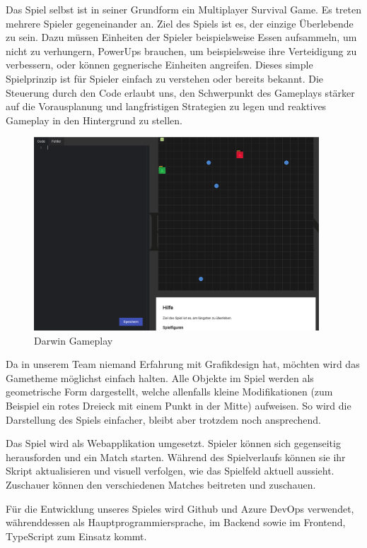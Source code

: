 \documentclass[11pt,a4paper]{scrartcl}
\begin{document}
Das Spiel selbst ist in seiner Grundform ein Multiplayer Survival Game.
Es treten mehrere Spieler gegeneinander an.
Ziel des Spiels ist es, der einzige Überlebende zu sein.
Dazu müssen Einheiten der Spieler beispielsweise Essen aufsammeln, um nicht zu verhungern, PowerUps brauchen, um beispielsweise ihre Verteidigung zu verbessern, oder können gegnerische Einheiten angreifen.
Dieses simple Spielprinzip ist für Spieler einfach zu verstehen oder bereits bekannt.
Die Steuerung durch den Code erlaubt uns, den Schwerpunkt des Gameplays stärker auf die Vorausplanung und langfristigen Strategien zu legen und reaktives Gameplay in den Hintergrund zu stellen.

\begin{figure}[h]
  \centering
  \includegraphics[width=0.95\textwidth]{darwin-gameplay}
  \caption{Darwin Gameplay}
\end{figure}

Da in unserem Team niemand Erfahrung mit Grafikdesign hat, möchten wird das Gametheme möglichst einfach halten.
Alle Objekte im Spiel werden als geometrische Form dargestellt, welche allenfalls kleine Modifikationen (zum Beispiel ein rotes Dreieck mit einem Punkt in der Mitte) aufweisen.
So wird die Darstellung des Spiels einfacher, bleibt aber trotzdem noch ansprechend.

Das Spiel wird als Webapplikation umgesetzt.
Spieler können sich gegenseitig herausforden und ein Match starten.
Während des Spielverlaufs können sie ihr Skript aktualisieren und visuell verfolgen, wie das Spielfeld aktuell aussieht. Zuschauer können den verschiedenen Matches beitreten und zuschauen.

Für die Entwicklung unseres Spieles wird Github und Azure DevOps verwendet,
währenddessen als Hauptprogrammiersprache, im Backend sowie im Frontend, TypeScript zum Einsatz kommt.
\end{document}
